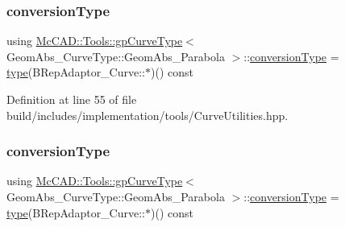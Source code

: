\subsubsection{\texorpdfstring{conversion\+Type}{conversionType}\hspace{0.1cm}{\footnotesize\ttfamily [1/2]}}
{\footnotesize\ttfamily using \hyperlink{structMcCAD_1_1Tools_1_1gpCurveType}{Mc\+C\+A\+D\+::\+Tools\+::gp\+Curve\+Type}$<$ Geom\+Abs\+\_\+\+Curve\+Type\+::\+Geom\+Abs\+\_\+\+Parabola $>$\+::\hyperlink{structMcCAD_1_1Tools_1_1gpCurveType_3_01GeomAbs__CurveType_1_1GeomAbs__Parabola_01_4_a39895972416d7cbcd11ba78c5dd3d745}{conversion\+Type} =  \hyperlink{structMcCAD_1_1Tools_1_1gpCurveType_3_01GeomAbs__CurveType_1_1GeomAbs__Parabola_01_4_a6f841cf7a5c058b9171c9c99ccf84985}{type}(B\+Rep\+Adaptor\+\_\+\+Curve\+::$\ast$)() const}



Definition at line 55 of file build/includes/implementation/tools/\+Curve\+Utilities.\+hpp.

\mbox{\label{structMcCAD_1_1Tools_1_1gpCurveType_3_01GeomAbs__CurveType_1_1GeomAbs__Parabola_01_4_a39895972416d7cbcd11ba78c5dd3d745}} 
\subsubsection{\texorpdfstring{conversion\+Type}{conversionType}\hspace{0.1cm}{\footnotesize\ttfamily [2/2]}}
{\footnotesize\ttfamily using \hyperlink{structMcCAD_1_1Tools_1_1gpCurveType}{Mc\+C\+A\+D\+::\+Tools\+::gp\+Curve\+Type}$<$ Geom\+Abs\+\_\+\+Curve\+Type\+::\+Geom\+Abs\+\_\+\+Parabola $>$\+::\hyperlink{structMcCAD_1_1Tools_1_1gpCurveType_3_01GeomAbs__CurveType_1_1GeomAbs__Parabola_01_4_a39895972416d7cbcd11ba78c5dd3d745}{conversion\+Type} =  \hyperlink{structMcCAD_1_1Tools_1_1gpCurveType_3_01GeomAbs__CurveType_1_1GeomAbs__Parabola_01_4_a6f841cf7a5c058b9171c9c99ccf84985}{type}(B\+Rep\+Adaptor\+\_\+\+Curve\+::$\ast$)() const}



